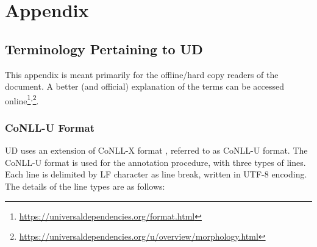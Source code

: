 \chapter{Appendix}
\label{appendix}

\section{Terminology Pertaining to UD}
\label{app:UDterminology}

This appendix is meant primarily for the offline/hard copy readers of the document. A better (and official) explanation of the terms can be accessed online\footnote{\url{https://universaldependencies.org/format.html}}\textsuperscript{,}\footnote{\url{https://universaldependencies.org/u/overview/morphology.html}}.

\subsection{CoNLL-U Format}
\label{app:conlluformat}

UD uses an extension of CoNLL-X format \citep{CONLLX}, referred to as CoNLL-U format. The CoNLL-U format is used for the annotation procedure, with three types of lines. Each line is delimited by LF character as line break, written in UTF-8 encoding. The details of the line types are as follows:

